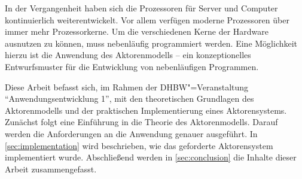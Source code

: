 In der Vergangenheit haben sich die Prozessoren für Server und Computer kontinuierlich weiterentwickelt.
Vor allem verfügen moderne Prozessoren über immer mehr Prozessorkerne.
Um die verschiedenen Kerne der Hardware ausnutzen zu können, muss nebenläufig programmiert werden.
Eine Möglichkeit hierzu ist die Anwendung des Aktorenmodells -- ein konzeptionelles Entwurfsmuster für die Entwicklung von nebenläufigen Programmen.

Diese Arbeit befasst sich, im Rahmen der DHBW"=Veranstaltung \enquote{Anwendungsentwicklung 1}, mit den theoretischen Grundlagen des Aktorenmodells und der praktischen Implementierung eines Aktorensystems.
Zunächst folgt eine Einführung in die Theorie des Aktorenmodells.
Darauf werden die Anforderungen an die Anwendung genauer ausgeführt.
In \autoref{sec:implementation} wird beschrieben, wie das geforderte Aktorensystem implementiert wurde.
Abschließend werden in \autoref{sec:conclusion} die Inhalte dieser Arbeit zusammengefasst.
